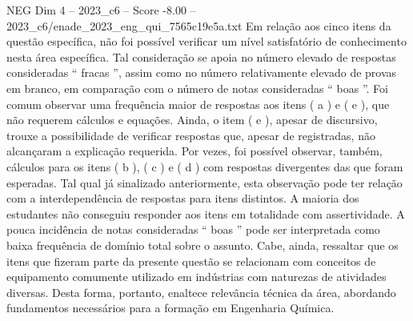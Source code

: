 \begin{textsample}{NEG Dim 4 – 2023\_c6 – Score -8.00 – 2023\_c6/enade\_2023\_eng\_qui\_7565c19e5a.txt}
Em relação aos cinco itens da questão específica, não foi possível verificar um nível satisfatório de conhecimento nesta área específica.
Tal consideração se apoia no número elevado de respostas consideradas “ fracas ”, assim como no número relativamente elevado de provas em branco, em comparação com o número de notas consideradas “ boas ”.
Foi comum observar uma frequência maior de respostas aos itens ( a ) e ( e ), que não requerem cálculos e equações.
Ainda, o item ( e ), apesar de discursivo, trouxe a possibilidade de verificar respostas que, apesar de registradas, não alcançaram a explicação requerida.
Por vezes, foi possível observar, também, cálculos para os itens ( b ), ( c ) e ( d ) com respostas divergentes das que foram esperadas.
Tal qual já sinalizado anteriormente, esta observação pode ter relação com a interdependência de respostas para itens distintos.
A maioria dos estudantes não conseguiu responder aos itens em totalidade com assertividade.
A pouca incidência de notas consideradas “ boas ” pode ser interpretada como baixa frequência de domínio total sobre o assunto.
Cabe, ainda, ressaltar que os itens que fizeram parte da presente questão se relacionam com conceitos de equipamento comumente utilizado em indústrias com naturezas de atividades diversas.
Desta forma, portanto, enaltece relevância técnica da área, abordando fundamentos necessários para a formação em Engenharia Química.

\end{textsample}
